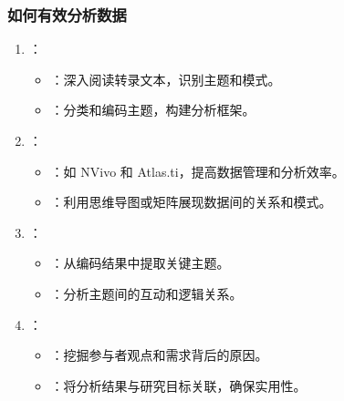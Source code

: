 \documentclass[letterpaper,10pt,english]{sphinxmanual}
\begin{document}
\subsubsection{如何有效分析数据}
\label{\detokenize{user-research/focus-group:id23}}\begin{enumerate}
%
\item {} 
\sphinxAtStartPar
{}：
\begin{itemize}
\item {} 
\sphinxAtStartPar
{}：深入阅读转录文本，识别主题和模式。

\item {} 
\sphinxAtStartPar
{}：分类和编码主题，构建分析框架。

\end{itemize}

\item {} 
\sphinxAtStartPar
{}：
\begin{itemize}
\item {} 
\sphinxAtStartPar
{}：如 NVivo 和 Atlas.ti，提高数据管理和分析效率。

\item {} 
\sphinxAtStartPar
{}：利用思维导图或矩阵展现数据间的关系和模式。

\end{itemize}

\item {} 
\sphinxAtStartPar
{}：
\begin{itemize}
\item {} 
\sphinxAtStartPar
{}：从编码结果中提取关键主题。

\item {} 
\sphinxAtStartPar
{}：分析主题间的互动和逻辑关系。

\end{itemize}

\item {} 
\sphinxAtStartPar
{}：
\begin{itemize}
\item {} 
\sphinxAtStartPar
{}：挖掘参与者观点和需求背后的原因。

\item {} 
\sphinxAtStartPar
{}：将分析结果与研究目标关联，确保实用性。


\end{itemize}
\end{enumerate}
\end{document}

